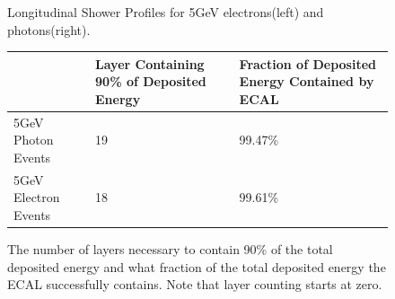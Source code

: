 \begin{figure}[h]
  \centering
  \caption[Longitudinal Shower Profiles For 5GeV Electrons and Photons]{Longitudinal Shower Profiles for 5GeV electrons(left) and photons(right).}
  \label{Fig:showers}
\end{figure}


\begin{figure}[h]
  \centering
  \label{Tab:showerstab}
  \begin{tabular}{l p{} p{}}
    \toprule
    ~     & Layer Containing 90\% of Deposited Energy  &   Fraction of Deposited Energy Contained by ECAL        \\
    \midrule
    5GeV Photon Events                & 19      & 99.47\%    \\ 
    \midrule
    5GeV Electron Events              & 18      & 99.61\% \\
    \midrule
    \bottomrule
  \end{tabular}
  \caption[ECAL Performance]{The number of layers necessary to contain 90\% of the total deposited energy and what fraction of the total deposited energy the ECAL successfully contains. Note that layer counting starts at zero.}
\end{figure}

